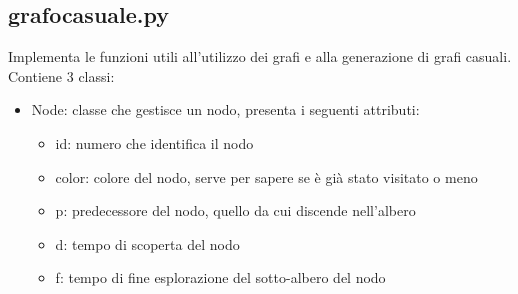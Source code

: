 \documentclass[]{article}
\begin{document}
\subsection*{grafocasuale.py}
Implementa le funzioni utili all'utilizzo dei grafi e alla generazione di grafi casuali. Contiene 3 classi:
\begin{itemize}

\item Node: classe che gestisce un nodo, presenta i seguenti attributi:
\begin{itemize}
\item id: numero che identifica il nodo
\item color: colore del nodo, serve per sapere se è già stato visitato o meno
\item p: predecessore del nodo, quello da cui discende nell'albero
\item d: tempo di scoperta del nodo
\item f: tempo di fine esplorazione del sotto-albero del nodo
\end{itemize}


\end{itemize}
\end{document}

